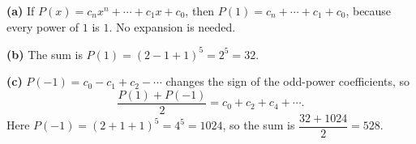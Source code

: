 \textbf{(a)} If $P(x)=c_nx^n+\cdots+c_1x+c_0$, then $P(1)=c_n+\cdots+c_1+c_0$, because every power of $1$ is $1$. No expansion is needed.

\textbf{(b)} The sum is $P(1)=(2-1+1)^5=2^5=\boxed{32}$.

\textbf{(c)} $P(-1)=c_0-c_1+c_2-\cdots$ changes the sign of the odd-power coefficients, so
\[\dfrac{P(1)+P(-1)}{2}=c_0+c_2+c_4+\cdots.\]
Here $P(-1)=(2+1+1)^5=4^5=1024$, so the sum is $\dfrac{32+1024}{2}=\boxed{528}$.
